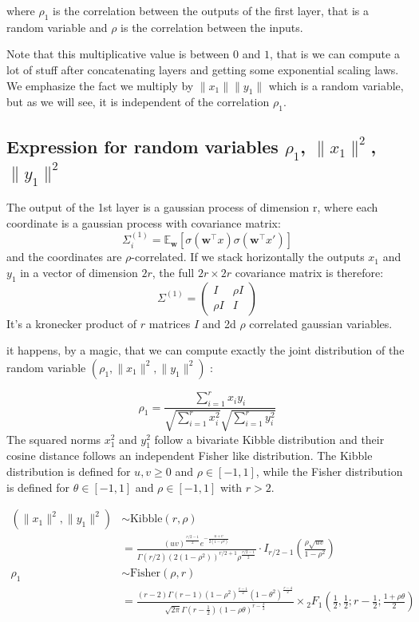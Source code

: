 \documentclass[11pt, a4paper]{article}
\begin{document}
where $\rho_1$ is the correlation between the outputs of the first layer, that is a random variable and $\rho$ is the correlation between the inputs.

Note that this multiplicative value is between $0$ and $1$, that is we can compute a lot of stuff after concatenating layers and getting some exponential scaling laws.
We emphasize the fact we multiply by $\|x_1\| \|y_1\|$ which is a random variable, but as we will see, it is independent of the correlation $\rho_1$.

\subsection{Expression for random variables $\rho_1$, $\|x_1\|^2$, $\|y_1\|^2$}
The output of the 1st layer is a gaussian process of dimension r, where each coordinate is a gaussian process with covariance matrix:
\[
\Sigma^{(1)}_i = \mathbb{E}_{\bm{w}} \left[ \sigma(\bm{w}^\top x) \sigma(\bm{w}^\top x') \right]
\]
and the coordinates are $\rho$-correlated. If we stack horizontally the outputs $x_1$ and $y_1$ in a vector of dimension $2r$, the full $2r \times 2r$ covariance matrix is therefore:
\[
\Sigma^{(1)} = \begin{pmatrix}
I & \rho I \\
\rho I & I
\end{pmatrix}
\]
It's a kronecker product of $r$ matrices $I$ and 2d $\rho$ correlated gaussian variables.


it happens, by a magic, that we can compute exactly the joint distribution of the random variable $(\rho_1, \|x_1\|^2, \|y_1\|^2)$ :

\[
\rho_1 = \frac{\sum_{i=1}^r x_i y_i }{\sqrt{\sum_{i=1}^r x_i^2} \sqrt{\sum_{i=1}^r y_i^2}}
\]
The squared norms $x_1^2$ and $y_1^2$ follow a bivariate Kibble distribution and their cosine distance follows an independent Fisher like distribution. The Kibble distribution is defined for $u,v \geq 0$ and $\rho \in [-1,1]$, while the Fisher distribution is defined for $\theta \in [-1,1]$ and $\rho \in [-1,1]$ with $r > 2$.

\begin{align*}
    (\|x_1\|^2, \|y_1\|^2) &\sim \text{Kibble}(r, \rho) \\
    &= \frac{(uv)^{\frac{r/2-1}{2}} e^{-\frac{u+v}{2(1-\rho^2)}}}{\Gamma(r/2) (2(1-\rho^2))^{r/2+1} \rho^{\frac{r/2-1}{2}}} \cdot I_{r/2-1}\left(\frac{\rho\sqrt{uv}}{1-\rho^2}\right) \\[1em]
    \rho_1 &\sim \text{Fisher}(\rho, r) \\
    &= \frac{(r-2)\Gamma(r-1)(1-\rho^2)^{\frac{r-1}{2}}(1-\theta^2)^{\frac{r-4}{2}}}{\sqrt{2\pi}\Gamma(r-\frac{1}{2})(1-\rho \theta)^{r-\frac{3}{2}}} \times {}_2F_1\left(\frac{1}{2}, \frac{1}{2}; r-\frac{1}{2}; \frac{1+\rho \theta}{2}\right)
\end{align*}
\end{document}
